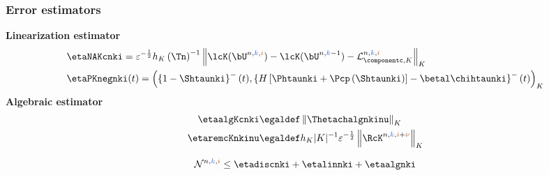 \documentclass[10 pt]{beamer}
\begin{document}
\begin{frame}
\frametitle{Error estimators}
\textcolor{cadmiumgreen}{\textbf{Linearization estimator}}
\begin{equation*}
\begin{split}
& \etaNAKcnki  = \varepsilon^{-\frac{1}{2}} h_K \left(\Tn\right)^{-1} \left\|\lcK(\bU^{n,\kk,\ii}) - \lcK(\bU^{n,\kk-1}) - \mathcal{L}_{\componentc,K}^{n,\kk,\ii} \right\|_K\\
& \etaPKnegnki(t)  = \left(\left\{1 - \Shtaunki\right\}^{-}(t),\left\{H\left[\Phtaunki + \Pcp\left(\Shtaunki\right)\right]-\betal \chihtaunki\right\}^{-}(t)\right)_K
\end{split}
\end{equation*}
\textcolor{cadmiumgreen}{\textbf{Algebraic estimator}}
\begin{equation*}
\begin{split}
\etaalgKcnki & \egaldef \left\|\Thetachalgnkinu \right\|_K\\
\etaremcKnkinu & \egaldef h_K |K|^{-1} \varepsilon^{-\frac{1}{2}} \left\|\RcK^{n,\kk,\ii+\nuu}  \right\|_K
\end{split}
\end{equation*}

\begin{theorem}
\begin{equation*}
\mathcal{N}^{n,\kk,\ii} \leq \etadiscnki + \etalinnki + \etaalgnki
\end{equation*}  
\end{theorem}
\end{frame}
\end{document}
